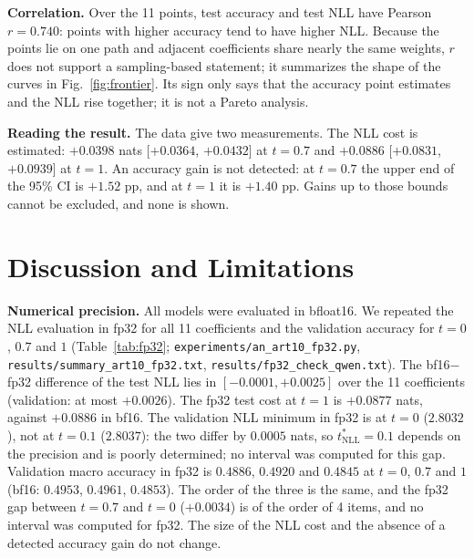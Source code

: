 \documentclass[conference]{IEEEtran}
\begin{document}
\textbf{Correlation.} Over the 11 points, test accuracy and test NLL have Pearson $r=0.740$: points with higher accuracy tend to have higher NLL. Because the points lie on one path and adjacent coefficients share nearly the same weights, $r$ does not support a sampling-based statement; it summarizes the shape of the curves in Fig.~\ref{fig:frontier}. Its sign only says that the accuracy point estimates and the NLL rise together; it is not a Pareto analysis.

\textbf{Reading the result.} The data give two measurements. The NLL cost is estimated: $+0.0398$ nats [$+0.0364$, $+0.0432$] at $t=0.7$ and $+0.0886$ [$+0.0831$, $+0.0939$] at $t=1$. An accuracy gain is not detected: at $t=0.7$ the upper end of the 95\% CI is $+1.52$ pp, and at $t=1$ it is $+1.40$ pp. Gains up to those bounds cannot be excluded, and none is shown.

\section{Discussion and Limitations}
\textbf{Numerical precision.} All models were evaluated in bfloat16. We repeated the NLL evaluation in fp32 for all 11 coefficients and the validation accuracy for $t=0$, $0.7$ and $1$ (Table~\ref{tab:fp32}; \texttt{experiments/an\_art10\_fp32.py}, \texttt{results/summary\_art10\_fp32.txt}, \texttt{results/fp32\_check\_qwen.txt}). The bf16$-$fp32 difference of the test NLL lies in $[-0.0001,+0.0025]$ over the 11 coefficients (validation: at most $+0.0026$). The fp32 test cost at $t=1$ is $+0.0877$ nats, against $+0.0886$ in bf16. The validation NLL minimum in fp32 is at $t=0$ ($2.8032$), not at $t=0.1$ ($2.8037$): the two differ by $0.0005$ nats, so $t^\ast_{\mathrm{NLL}}=0.1$ depends on the precision and is poorly determined; no interval was computed for this gap. Validation macro accuracy in fp32 is $0.4886$, $0.4920$ and $0.4845$ at $t=0$, $0.7$ and $1$ (bf16: $0.4953$, $0.4961$, $0.4853$). The order of the three is the same, and the fp32 gap between $t=0.7$ and $t=0$ ($+0.0034$) is of the order of 4 items, and no interval was computed for fp32. The size of the NLL cost and the absence of a detected accuracy gain do not change.
\end{document}
